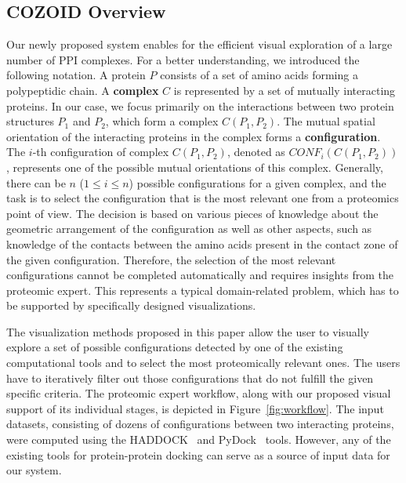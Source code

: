 \documentclass{bmcart}
\begin{document}
\subsection*{COZOID Overview}
Our newly proposed system enables for the efficient visual exploration of a large number of PPI complexes.
For a better understanding, we introduced the following notation.
A protein $P$ consists of a set of amino acids forming a polypeptidic chain.
A \textbf{complex} $C$ is represented by a set of mutually interacting proteins.
In our case, we focus primarily on the interactions between two protein structures $P_1$ and $P_2$, which form a complex $C(P_1,P_2)$.
The mutual spatial orientation of the interacting proteins in the complex forms a \textbf{configuration}.
The $i$-th configuration of complex $C(P_1,P_2)$, denoted as $CONF_i(C(P_1,P_2))$, represents one of the possible mutual orientations of this complex.
Generally, there can be $n$ ($1 \leq i \leq n$) possible configurations for a given complex, and the task is to select the configuration that is the most relevant one from a proteomics point of view.
The decision is based on various pieces of knowledge about the geometric arrangement of the configuration as well as other aspects, such as knowledge of the contacts between the amino acids present in the contact zone of the given configuration.
Therefore, the selection of the most relevant configurations cannot be completed automatically and requires insights from the proteomic expert.
This represents a typical domain-related problem, which has to be supported by specifically designed visualizations.

The visualization methods proposed in this paper allow the user to visually explore a set of possible configurations detected by one of the existing computational tools and to select the most proteomically relevant ones.
The users have to iteratively filter out those configurations that do not fulfill the given specific criteria.
The proteomic expert workflow, along with our proposed visual support of its individual stages, is depicted in Figure~\ref{fig:workflow}.
The input datasets, consisting of dozens of configurations between two interacting proteins, were computed using the HADDOCK~\cite{haddock} and PyDock~\cite{pydock} tools. 
However, any of the existing tools for protein-protein docking can serve as a source of input data for our system.
\end{document}

